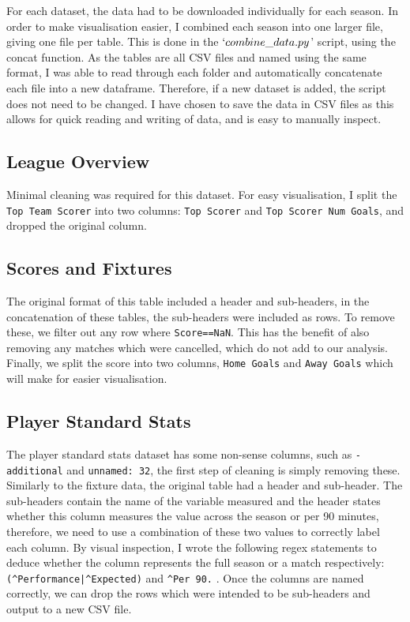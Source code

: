 \documentclass[12pt, a4paper, twocolumn]{article}
\begin{document}
For each dataset, the data had to be downloaded individually for each season. In order to make visualisation easier, I combined each season into one larger file, giving one file per table. This is done in the $`combine\_data.py$' script, using the concat function. As the tables are all CSV files and named using the same format, I was able to read through each folder and automatically concatenate each file into a new dataframe. Therefore, if a new dataset is added, the script does not need to be changed. I have chosen to save the data in CSV files as this allows for quick reading and writing of data, and is easy to manually inspect.

\subsection{League Overview}

Minimal cleaning was required for this dataset. For easy visualisation, I split the \verb|Top Team Scorer| into two columns: \verb|Top Scorer| and \verb|Top Scorer Num Goals|, and dropped the original column.

\subsection{Scores and Fixtures}

The original format of this table included a header and sub-headers, in the concatenation of these tables, the sub-headers were included as rows. To remove these, we filter out any row where \verb|Score==NaN|. This has the benefit of also removing any matches which were cancelled, which do not add to our analysis. Finally, we split the score into two columns, \verb|Home Goals| and \verb|Away Goals| which will make for easier visualisation.

\subsection{Player Standard Stats}

The player standard stats dataset has some non-sense columns, such as \verb|-additional| and \verb|unnamed: 32|, the first step of cleaning is simply removing these. Similarly to the fixture data, the original table had a header and sub-header. The sub-headers contain the name of the variable measured and the header states whether this column measures the value across the season or per 90 minutes, therefore, we need to use a combination of these two values to correctly label each column. By visual inspection, I wrote the following regex statements to deduce whether the column represents the full season or a match respectively: \verb=(^Performance|^Expected)= and \verb=^Per 90.= . Once the columns are named correctly, we can drop the rows which were intended to be sub-headers and output to a new CSV file.
\end{document}
